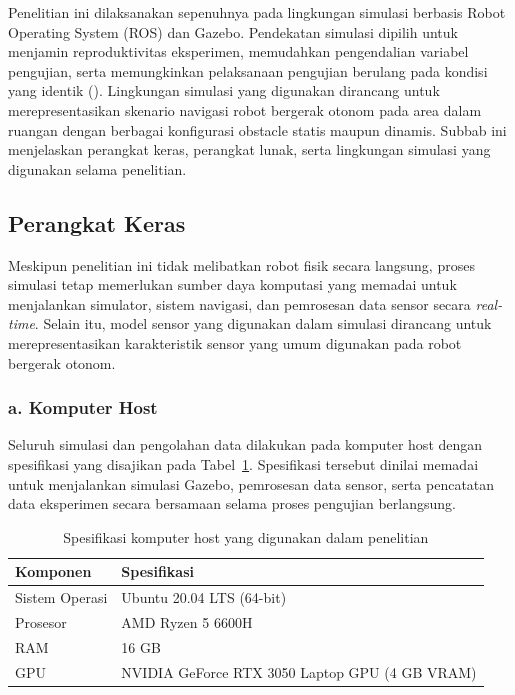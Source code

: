 Penelitian ini dilaksanakan sepenuhnya pada lingkungan simulasi berbasis Robot Operating System (ROS) dan Gazebo. Pendekatan simulasi dipilih untuk menjamin reproduktivitas eksperimen, memudahkan pengendalian variabel pengujian, serta memungkinkan pelaksanaan pengujian berulang pada kondisi yang identik (\cite{Adiuku2024}). Lingkungan simulasi yang digunakan dirancang untuk merepresentasikan skenario navigasi robot bergerak otonom pada area dalam ruangan dengan berbagai konfigurasi obstacle statis maupun dinamis. Subbab ini menjelaskan perangkat keras, perangkat lunak, serta lingkungan simulasi yang digunakan selama penelitian.

\subsection{Perangkat Keras}
\label{sec:perangkat_keras}

Meskipun penelitian ini tidak melibatkan robot fisik secara langsung, proses simulasi tetap memerlukan sumber daya komputasi yang memadai untuk menjalankan simulator, sistem navigasi, dan pemrosesan data sensor secara \textit{real-time}. Selain itu, model sensor yang digunakan dalam simulasi dirancang untuk merepresentasikan karakteristik sensor yang umum digunakan pada robot bergerak otonom.

\subsubsection*{a. Komputer Host}

Seluruh simulasi dan pengolahan data dilakukan pada komputer host dengan spesifikasi yang disajikan pada Tabel~\ref{tab:spesifikasi_komputer_host}. Spesifikasi tersebut dinilai memadai untuk menjalankan simulasi Gazebo, pemrosesan data sensor, serta pencatatan data eksperimen secara bersamaan selama proses pengujian berlangsung.

\begin{table}[H]
\centering
\caption{Spesifikasi komputer host yang digunakan dalam penelitian}
\label{tab:spesifikasi_komputer_host}
\begin{tabular}{ll}
\toprule
\textbf{Komponen} & \textbf{Spesifikasi} \\
\midrule
Sistem Operasi & Ubuntu 20.04 LTS (64-bit) \\
Prosesor & AMD Ryzen 5 6600H \\
RAM & 16 GB \\
GPU & NVIDIA GeForce RTX 3050 Laptop GPU (4 GB VRAM) \\
\bottomrule
\end{tabular}
\end{table}

